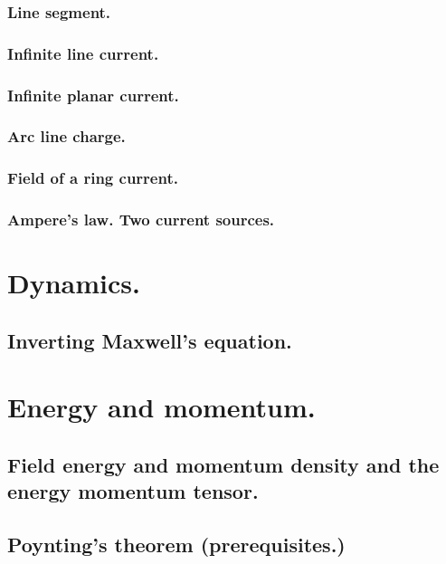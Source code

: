          \subsubsection{Line segment.}
            
         \subsubsection{Infinite line current.}
            
         \subsubsection{Infinite planar current.}
            
         \subsubsection{Arc line charge.}
            
         \subsubsection{Field of a ring current.}
            
         \subsubsection{Ampere's law.  Two current sources.}
            
      \section{Dynamics.}
         \subsection{Inverting Maxwell's equation.}
            
      \section{Energy and momentum.}
         \subsection{Field energy and momentum density and the energy momentum tensor.}
            
         \subsection{Poynting's theorem (prerequisites.)}
            
